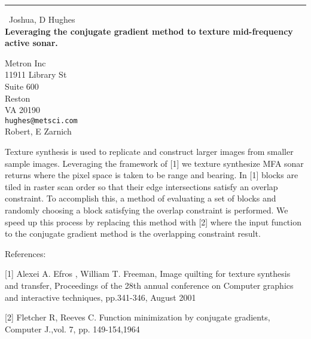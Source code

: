 \documentclass{report}
\begin{document}
\begin{center}
\rule{6in}{1pt} \
{\large Joshua, D Hughes \\
{\bf Leveraging the conjugate gradient method to texture mid-frequency active sonar.}}

Metron Inc \\ 11911 Library St \\ Suite 600 \\ Reston \\ VA 20190
\\
{\tt hughes@metsci.com}\\
Robert, E Zarnich\end{center}

Texture synthesis is used to replicate and construct larger images from
smaller sample images. Leveraging the framework of [1] we texture
synthesize MFA sonar returns where the pixel space is taken to be range
and bearing. In [1] blocks are tiled in raster scan order so that their
edge intersections satisfy an overlap constraint. To accomplish this, a
method of evaluating a set of blocks and randomly choosing a block
satisfying the overlap constraint is performed. We speed up this process
by replacing this method with [2] where the input function to the
conjugate gradient method is the overlapping constraint result.


References:

[1] Alexei A. Efros , William T. Freeman, Image quilting for texture
synthesis and transfer, Proceedings of the 28th annual conference on
Computer graphics and interactive techniques, pp.341-346, August 2001

[2] Fletcher R, Reeves C. Function minimization by conjugate gradients,
Computer J.,vol. 7, pp. 149-154,1964
\end{document}
